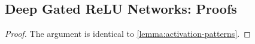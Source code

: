 \subsection{Deep Gated ReLU Networks: Proofs}

\gatedLimitingActivationSet*
\begin{proof}
    The argument is identical to \cref{lemma:activation-patterns}.
\end{proof}



